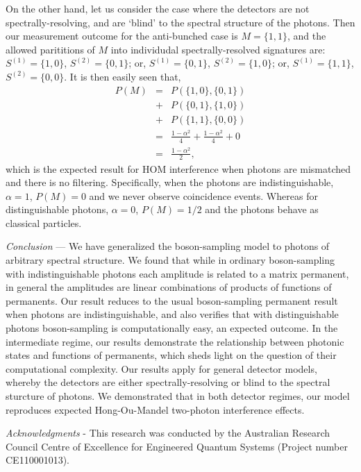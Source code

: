 \documentclass[aps,prl,twocolumn,amsmath,amssymb,nofootinbib,superscriptaddress]{revtex4}
\begin{document}
On the other hand, let us consider the case where the detectors are not spectrally-resolving, and are `blind' to the spectral structure of the photons. Then our measurement outcome for the anti-bunched case is \mbox{$M=\{1,1\}$}, and the allowed parititions of $M$ into individudal spectrally-resolved signatures are: \mbox{$S^{(1)}=\{1,0\}$}, \mbox{$S^{(2)}=\{0,1\}$}; or, \mbox{$S^{(1)}=\{0,1\}$}, \mbox{$S^{(2)}=\{1,0\}$}; or, \mbox{$S^{(1)}=\{1,1\}$}, \mbox{$S^{(2)}=\{0,0\}$}. It is then easily seen that,
\begin{eqnarray}
P(M) &=& P(\{1,0\},\{0,1\}) \nonumber \\
&+& P(\{0,1\},\{1,0\}) \nonumber \\
&+& P(\{1,1\},\{0,0\}) \\ \nonumber
&=& \frac{1-\alpha^2}{4} + \frac{1-\alpha^2}{4} + 0 \nonumber \\
&=& \frac{1-\alpha^2}{2},
\end{eqnarray}
which is the expected result for HOM interference when photons are mismatched and there is no filtering. Specifically, when the photons are indistinguishable, \mbox{$\alpha=1$}, \mbox{$P(M)=0$} and we never observe coincidence events. Whereas for distinguishable photons, \mbox{$\alpha=0$}, \mbox{$P(M)=1/2$} and the photons behave as classical particles.

%
%

\emph{Conclusion} --- We have generalized the boson-sampling model to photons of arbitrary spectral structure. We found that while in ordinary boson-sampling with indistinguishable photons each amplitude is related to a matrix permanent, in general the amplitudes are linear combinations of products of functions of permanents. Our result reduces to the usual boson-sampling permanent result when photons are indistinguishable, and also verifies that with distinguishable photons boson-sampling is computationally easy, an expected outcome. In the intermediate regime, our results demonstrate the relationship between photonic states and functions of permanents, which sheds light on the question of their computational complexity. Our results apply for general detector models, whereby the detectors are either spectrally-resolving or blind to the spectral sturcture of photons. We demonstrated that in both detector regimes, our model reproduces expected Hong-Ou-Mandel two-photon interference effects.

%
%

\begin{acknowledgments}
\emph{Acknowledgments} - This research was conducted by the Australian Research Council Centre of Excellence for Engineered Quantum Systems (Project number CE110001013).
\end{acknowledgments}

%
%


\end{document}
